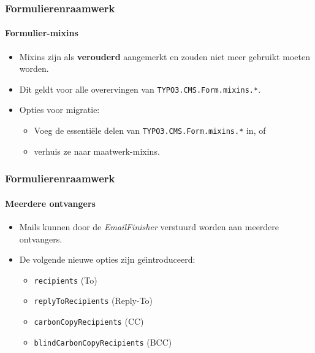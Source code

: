 
\begin{frame}[fragile]
	\frametitle{Formulierenraamwerk}
	\framesubtitle{Formulier-mixins}

	\begin{itemize}
		\item Mixins zijn als \textbf{verouderd} aangemerkt en zouden niet meer gebruikt moeten worden.
		\item Dit geldt voor alle overervingen van \texttt{TYPO3.CMS.Form.mixins.*}.
		\item Opties voor migratie:

			\begin{itemize}
				\item Voeg de essenti\"ele delen van \texttt{TYPO3.CMS.Form.mixins.*} in, of
				\item verhuis ze naar maatwerk-mixins.
			\end{itemize}

	\end{itemize}

\end{frame}


\begin{frame}[fragile]
	\frametitle{Formulierenraamwerk}
	\framesubtitle{Meerdere ontvangers}

	\begin{itemize}
		\item Mails kunnen door de \textit{EmailFinisher} verstuurd worden aan meerdere ontvangers.

		\item De volgende nieuwe opties zijn ge\"{\i}ntroduceerd:

			\begin{itemize}
				\item \texttt{recipients} (To)
				\item \texttt{replyToRecipients} (Reply-To)
				\item \texttt{carbonCopyRecipients} (CC)
				\item \texttt{blindCarbonCopyRecipients} (BCC)
			\end{itemize}

	\end{itemize}

\end{frame}

